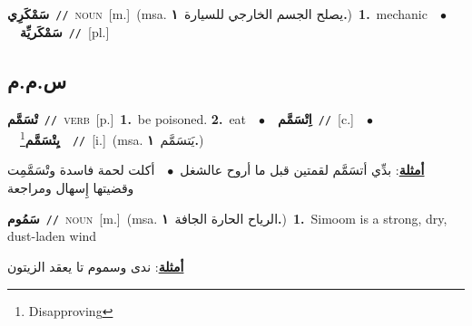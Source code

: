 \documentclass[10pt,a4paper,twoside]{article} %
\begin{document}
\begin{multicols}{2}
{\setlength\topsep{0pt}\textbf{\foreignlanguage{arabic}{سَمْكَرِي}}\ {\color{gray}\texttt{//}\color{black}}\ \textsc{noun}\ [m.]\ \color{gray}(msa. \foreignlanguage{arabic}{يصلح الجسم الخارجي للسيارة}~\foreignlanguage{arabic}{\textbf{١.}})\color{black}\ \textbf{1.}~mechanic\ \ $\bullet$\ \ \setlength\topsep{0pt}\textbf{\foreignlanguage{arabic}{سَمْكَريِّة}}\ {\color{gray}\texttt{//}\color{black}}\ [pl.]\ } \vspace{2mm}

\vspace{-3mm}
\subsection*{\color{blue}\foreignlanguage{arabic}{س.م.م}\color{blue}{}} 

{\setlength\topsep{0pt}\textbf{\foreignlanguage{arabic}{تْسَمَّم}}\ {\color{gray}\texttt{//}\color{black}}\ \textsc{verb}\ [p.]\ \textbf{1.}~be poisoned.  \textbf{2.}~eat\ \ $\bullet$\ \ \setlength\topsep{0pt}\textbf{\foreignlanguage{arabic}{اِتْسَمَّم}}\ {\color{gray}\texttt{//}\color{black}}\ [c.]\ \ $\bullet$\ \ \setlength\topsep{0pt}\textbf{\foreignlanguage{arabic}{يِتْسَمَّم}}\footnote{Disapproving}\ \ {\color{gray}\texttt{//}\color{black}}\ [i.]\ \color{gray}(msa. \foreignlanguage{arabic}{يَتسَمَّم}~\foreignlanguage{arabic}{\textbf{١.}})\color{black}\  \begin{flushright}\color{gray}\foreignlanguage{arabic}{\textbf{\underline{\foreignlanguage{arabic}{أمثلة}}}: بدِّي أتسَمَّم لقمتين قبل ما أروح عالشغل\ $\bullet$\ \  أكلت لحمة فاسدة وتْسَمَّمِت وقضيتها إِسهال ومراجعة}\end{flushright}\color{black}} \vspace{2mm}

{\setlength\topsep{0pt}\textbf{\foreignlanguage{arabic}{سَمُوم}}\ {\color{gray}\texttt{//}\color{black}}\ \textsc{noun}\ [m.]\ \color{gray}(msa. \foreignlanguage{arabic}{الرياح الحارة الجافة}~\foreignlanguage{arabic}{\textbf{١.}})\color{black}\ \textbf{1.}~Simoom is a strong, dry, dust-laden wind\  \begin{flushright}\color{gray}\foreignlanguage{arabic}{\textbf{\underline{\foreignlanguage{arabic}{أمثلة}}}: ندى وسموم تا يعقد الزيتون}\end{flushright}\color{black}} \vspace{2mm}


\end{multicols}
\end{document}
